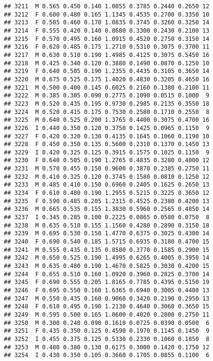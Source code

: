 \documentclass[
]{article}
\begin{document}
\begin{verbatim}
## 3211  M 0.565 0.450 0.140 1.0055 0.3785 0.2440 0.2650 12
## 3212  F 0.600 0.480 0.165 1.1345 0.4535 0.2700 0.3350 10
## 3213  F 0.585 0.460 0.170 1.0835 0.3745 0.3260 0.3250 14
## 3214  F 0.555 0.420 0.140 0.8680 0.3300 0.2430 0.2100 13
## 3215  F 0.570 0.495 0.160 1.0915 0.4520 0.2750 0.3150 14
## 3216  F 0.620 0.485 0.175 1.2710 0.5310 0.3075 0.3700 11
## 3217  M 0.630 0.510 0.190 1.4985 0.4125 0.3075 0.5450 16
## 3218  M 0.425 0.340 0.120 0.3880 0.1490 0.0870 0.1250 10
## 3219  F 0.640 0.505 0.190 1.2355 0.4435 0.3105 0.3650 14
## 3220  M 0.675 0.525 0.175 1.4020 0.4830 0.3205 0.4650 16
## 3221  M 0.500 0.400 0.145 0.6025 0.2160 0.1380 0.2100 11
## 3222  M 0.385 0.305 0.090 0.2775 0.1090 0.0515 0.1000  9
## 3223  M 0.520 0.435 0.195 0.9730 0.2985 0.2135 0.3550 18
## 3224  M 0.520 0.415 0.175 0.7530 0.2580 0.1710 0.2550  8
## 3225  M 0.640 0.525 0.200 1.3765 0.4400 0.3075 0.4700 16
## 3226  I 0.440 0.350 0.120 0.3750 0.1425 0.0965 0.1150  9
## 3227  F 0.420 0.320 0.130 0.4135 0.1645 0.1060 0.1190 10
## 3228  F 0.450 0.350 0.135 0.5600 0.2310 0.1370 0.1450 13
## 3229  I 0.420 0.325 0.125 0.3915 0.1575 0.1025 0.1150  9
## 3230  F 0.640 0.505 0.190 1.2765 0.4835 0.3280 0.4000 12
## 3231  M 0.570 0.455 0.150 0.9600 0.3870 0.2385 0.2750 11
## 3232  M 0.410 0.325 0.120 0.3745 0.1580 0.0810 0.1250 12
## 3233  M 0.485 0.410 0.150 0.6960 0.2405 0.1625 0.2650 13
## 3234  F 0.610 0.480 0.190 1.2955 0.5215 0.3225 0.3650 12
## 3235  F 0.590 0.485 0.205 1.2315 0.4525 0.2380 0.4200 13
## 3236  M 0.665 0.535 0.155 1.3830 0.5960 0.2565 0.4850 14
## 3237  I 0.345 0.285 0.100 0.2225 0.0865 0.0580 0.0750  8
## 3238  M 0.635 0.510 0.155 1.1560 0.4280 0.2890 0.3150 18
## 3239  M 0.695 0.530 0.150 1.4770 0.6375 0.3025 0.4300 14
## 3240  F 0.690 0.540 0.185 1.5715 0.6935 0.3180 0.4700 15
## 3241  M 0.555 0.435 0.135 0.8580 0.3770 0.1585 0.2900 15
## 3242  M 0.650 0.525 0.190 1.4995 0.6265 0.4005 0.3950 14
## 3243  M 0.635 0.480 0.190 1.4670 0.5825 0.3030 0.4200 15
## 3244  F 0.655 0.510 0.160 1.0920 0.3960 0.2825 0.3700 14
## 3245  F 0.690 0.555 0.205 1.8165 0.7785 0.4395 0.5150 19
## 3246  F 0.695 0.550 0.160 1.6365 0.6940 0.3005 0.4400 13
## 3247  M 0.550 0.435 0.160 0.9060 0.3420 0.2190 0.2950 13
## 3248  F 0.610 0.495 0.190 1.2130 0.4640 0.3060 0.3650 15
## 3249  M 0.595 0.500 0.165 1.0600 0.4020 0.2800 0.2750 11
## 3250  M 0.300 0.240 0.090 0.1610 0.0725 0.0390 0.0500  6
## 3251  F 0.435 0.350 0.125 0.4590 0.1970 0.1145 0.1450  9
## 3252  I 0.455 0.375 0.125 0.5330 0.2330 0.1060 0.1850  8
## 3253  M 0.480 0.380 0.130 0.6175 0.3000 0.1420 0.1750 12
## 3254  I 0.430 0.350 0.105 0.3660 0.1705 0.0855 0.1100  6

\end{verbatim}
\end{document}
